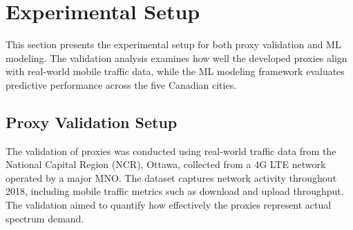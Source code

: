 \documentclass[conference]{IEEEtran}
\begin{document}
\section{Experimental Setup}
\label{sec:experimental_setup}

This section presents the experimental setup for both proxy validation and ML modeling. The validation analysis examines how well the developed proxies align with real-world mobile traffic data, while the ML modeling framework evaluates predictive performance across the five Canadian cities.

\subsection{Proxy Validation Setup}
The validation of proxies was conducted using real-world traffic data from the National Capital Region (NCR), Ottawa, collected from a 4G LTE network operated by a major MNO. The dataset captures network activity throughout 2018, including mobile traffic metrics such as download and upload throughput. The validation aimed to quantify how effectively the proxies represent actual spectrum demand.
\end{document}
